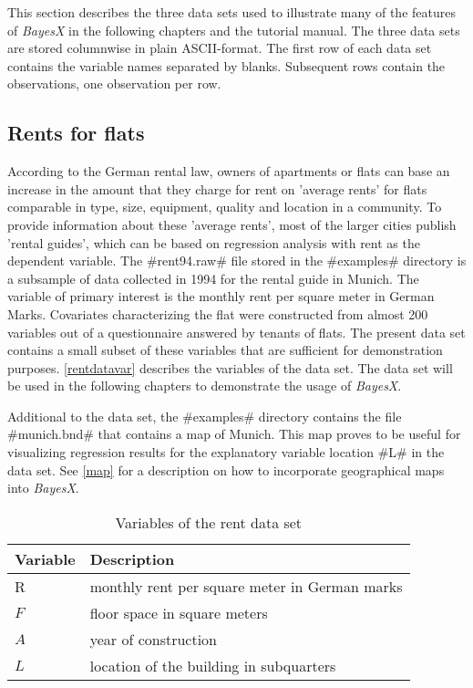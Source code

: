 This section describes the three data sets used to illustrate many
of the features of {\em BayesX} in the following chapters and the
tutorial manual. The three data sets are stored columnwise in plain
ASCII-format. The first row of each data set contains the variable
names separated by blanks. Subsequent rows contain the observations,
one observation per row.

\subsection{Rents for flats}
\label{rentdata}  

According to the German rental law, owners of apartments or flats
can base an increase in the amount that they charge for rent on
'average rents' for flats comparable in type, size, equipment,
quality and location in a community. To provide information about
these 'average rents', most of the larger cities publish 'rental
guides', which can be based on regression analysis with rent as
the dependent variable. The #rent94.raw# file stored in the
#examples# directory is a subsample of data collected in 1994 for
the rental guide in Munich. The variable of primary interest is
the monthly rent per square meter in German Marks. Covariates
characterizing the flat were constructed from almost 200 variables
out of a questionnaire answered by tenants of flats. The present
data set contains a small subset of these variables that are
sufficient for demonstration purposes. \autoref{rentdatavar} describes the
variables of the data set. The data set will be used in the
following chapters to demonstrate the usage of {\em BayesX}.

Additional to the data set, the #examples# directory contains
the file #munich.bnd# that contains a map of Munich. This map
proves to be useful for visualizing regression results for the
explanatory variable location #L# in the data set. See
\autoref{map} for a description on how to incorporate geographical
maps into {\em BayesX}.

\begin{table}

\centering
\begin{tabular}{|l|l|}
\hline
{\bf Variable} & {\bf Description} \\
\hline
R & monthly rent per square meter in German marks \\
$F$ & floor space in square meters \\
$A$ & year of construction \\
$L$ & location of the building in subquarters \\
 \hline
\end{tabular}
{\em \caption{\label{rentdatavar}Variables of the rent data set}}
\end{table}


